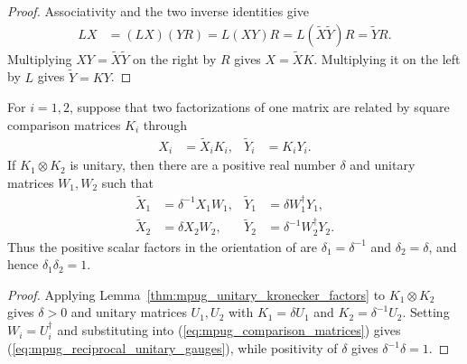 \begin{proof}\leanok
    Associativity and the two inverse identities give
    \begin{align}
        LX & =(LX)(YR)=L(XY)R
        =L(\widetilde X\widetilde Y)R=\widetilde YR.
    \end{align}
    Multiplying $XY=\widetilde X\widetilde Y$ on the right by $R$ gives
    $X=\widetilde XK$. Multiplying it on the left by $L$ gives
    $\widetilde Y=KY$.
\end{proof}

\begin{lemma}
    \label{thm:mpug_reciprocal_unitary_gauges}
    \leanok
    For $i=1,2$, suppose that two factorizations of one matrix are related
    by square comparison matrices $K_i$ through
    \begin{align}
        X_i & =\widetilde X_iK_i, & \widetilde Y_i & =K_iY_i.
        \label{eq:mpug_comparison_matrices}
    \end{align}
    If $K_1\otimes K_2$ is unitary, then there are a positive real number
    $\delta$ and unitary matrices $W_1,W_2$ such that
    \begin{align}
        \widetilde X_1 & =\delta^{-1}X_1W_1,          &
        \widetilde Y_1 & =\delta W_1^\dagger Y_1,       \\
        \widetilde X_2 & =\delta X_2W_2,              &
        \widetilde Y_2 & =\delta^{-1}W_2^\dagger Y_2.
        \label{eq:mpug_reciprocal_unitary_gauges}
    \end{align}
    Thus the positive scalar factors in the orientation of
    \cite[lines~1052--1066]{FrancoRubio2025MPUGauging} are
    $\delta_1=\delta^{-1}$ and $\delta_2=\delta$, and hence
    $\delta_1\delta_2=1$.
\end{lemma}

\begin{proof}\leanok
    Applying Lemma~\ref{thm:mpug_unitary_kronecker_factors} to
    $K_1\otimes K_2$ gives $\delta>0$ and unitary matrices $U_1,U_2$ with
    $K_1=\delta U_1$ and $K_2=\delta^{-1}U_2$. Setting
    $W_i=U_i^\dagger$ and substituting into
    (\ref{eq:mpug_comparison_matrices}) gives
    (\ref{eq:mpug_reciprocal_unitary_gauges}), while positivity of $\delta$
    gives $\delta^{-1}\delta=1$.
\end{proof}

